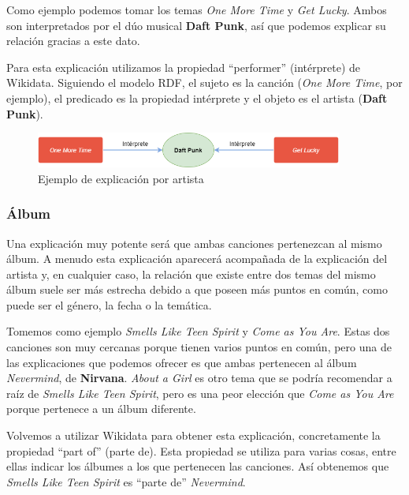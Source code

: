 Como ejemplo podemos tomar los temas \textit{One More Time} y \textit{Get Lucky}. Ambos son interpretados por el dúo musical \textbf{Daft Punk}, así que podemos explicar su relación gracias a este dato.

Para esta explicación utilizamos la propiedad ``performer'' (intérprete) de Wikidata. Siguiendo el modelo RDF, el sujeto es la canción (\textit{One More Time}, por ejemplo), el predicado es la propiedad intérprete y el objeto es el artista (\textbf{Daft Punk}). \\

\begin{figure}[h!]
	\centering
	\includegraphics[width = 0.9\textwidth]{Imagenes/Bitmap/Artista ejemplo.png}
	\caption{Ejemplo de explicación por artista}
	\label{fig:sampleImage}
\end{figure}

\subsubsection*{Álbum}

Una explicación muy potente será que ambas canciones pertenezcan al mismo álbum. A menudo esta explicación aparecerá acompañada de la explicación del artista y, en cualquier caso, la relación que existe entre dos temas del mismo álbum suele ser más estrecha debido a que poseen más puntos en común, como puede ser el género, la fecha o la temática.

Tomemos como ejemplo \textit{Smells Like Teen Spirit} y \textit{Come as You Are}. Estas dos canciones son muy cercanas porque tienen varios puntos en común, pero una de las explicaciones que podemos ofrecer es que ambas pertenecen al álbum \textit{Nevermind}, de \textbf{Nirvana}. \textit{About a Girl} es otro tema que se podría recomendar a raíz de \textit{Smells Like Teen Spirit}, pero es una peor elección que \textit{Come as You Are} porque pertenece a un álbum diferente.

Volvemos a utilizar Wikidata para obtener esta explicación, concretamente la propiedad ``part of'' (parte de). Esta propiedad se utiliza para varias cosas, entre ellas indicar los álbumes a los que pertenecen las canciones. Así obtenemos que \textit{Smells Like Teen Spirit} es ``parte de'' \textit{Nevermind}.\\

